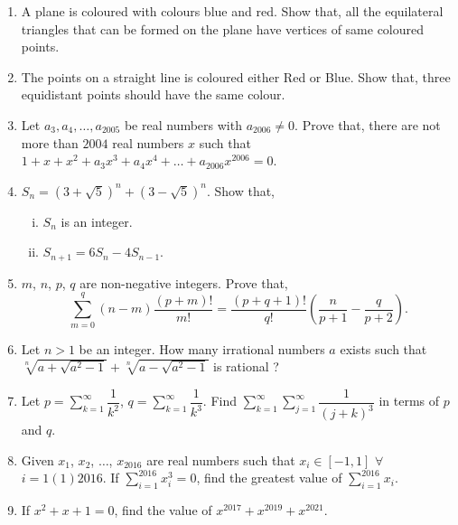 \documentclass[11pt, a4paper]{article}
\begin{document}
\begin{enumerate}
	\item A plane is coloured with colours blue and red. Show that, all the equilateral triangles that can be formed on the plane have vertices of same coloured points.
	
	\item The points on a straight line is coloured either Red or Blue. Show that, three equidistant points should have the same colour.
	
	\item Let $a_3, a_4, \ldots, a_{2005}$ be real numbers with $a_{2006} \neq 0$. Prove that, there are not more than $2004$ real numbers $x$ such that $1+x+x^2 + a_3x^3 + a_4x^4 + \ldots + a_{2006}x^{2006} = 0$.
	
	\item $S_n = \left( 3 + \sqrt{5} \right)^n + \left( 3 - \sqrt{5} \right)^n $. Show that, 
	\begin{enumerate}[(i)]
	\item $S_n$ is an integer.
	\item $S_{n+1} = 6 S_n - 4 S_{n-1}$.
	\end{enumerate}
	
	\item $m$, $n$, $p$, $q$ are non-negative integers. Prove that, $$ \sum\limits_{m = 0}^{q} \left(n-m \right) \dfrac{\left(p+m\right)!}{m!} = \dfrac{\left(p+q+1\right)!}{q!} \left( \dfrac{n}{p+1} - \dfrac{q}{p+2}\right).$$
	
	
	\item Let $n > 1$ be an integer. How many irrational numbers $a$ exists such that $\sqrt[n]{a + \sqrt{a^2 - 1}} + \sqrt[n]{a - \sqrt{a^2 - 1}}$ is rational ?
	
	\item Let $p = \sum \limits_{k = 1}^{\infty} \dfrac{1}{k^2}$, $q = \sum \limits_{k = 1}^{\infty} \dfrac{1}{k^3}$. Find $\sum \limits_{k = 1}^{\infty} \sum \limits_{j = 1}^{\infty} \dfrac{1}{(j+k)^3}$ in terms of $p$ and $q$.
	

	\item Given $x_1$, $x_2$, $\ldots$, $x_{2016}$ are real numbers such that $x_i \in [-1, 1]$ $\forall$ $i = 1(1)2016$. If $\sum \limits_{i = 1}^{2016} x_i^3 = 0$, find the greatest value of $\sum \limits_{i = 1}^{2016} x_i$.
	
	\item If $x^2 + x + 1 = 0$, find the value of $x^{2017} + x^{2019} + x^{2021}$.
	

\end{enumerate}
\end{document}
